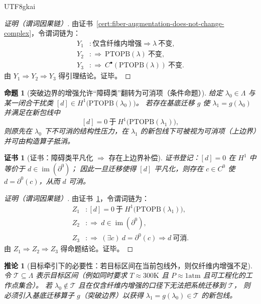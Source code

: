 \documentclass[12pt]{article}
\newtheorem{proposition}{命题}[section]
\newtheorem{corollary}{推论}[section]
\newtheorem{Certificate}{证书}[section]
\newcommand{\PTOPB}{\ensuremath{\mathrm{PTOPB}}}
\begin{document}
\begin{CJK*}{UTF8}{gkai}
\begin{proof}[证明（谓词因果链）]
由证书~\ref{cert:fiber-augmentation-does-not-change-complex}，令谓词链为：
\[
\begin{aligned}
  Y_1 &: \text{仅含纤维内增强}\Rightarrow \lambda\ \text{不变},\\
  Y_2 &: \Rightarrow\ \PTOPB(\lambda)\ \text{不变},\\
  Y_3 &: \Rightarrow\ C^\bullet(\PTOPB(\lambda))\ \text{不变}.
\end{aligned}
\]
由 $Y_1\Rightarrow Y_2\Rightarrow Y_3$ 得引理结论。证毕。
\end{proof}

\begin{proposition}[突破边界的增强允许“障碍类”翻转为可消项（条件命题）]
\label{prop:boundary-shift-can-trivialize-obstruction}
给定 $\lambda_0\in\Lambda$ 与某一闭合干扰类 $[d]\in H^1\bigl(\PTOPB(\lambda_0)\bigr)$。
若存在基底迁移 $g$ 使 $\lambda_1=g(\lambda_0)$ 并满足在新包线中
\[
  [d] = 0\ \text{于}\ H^1\bigl(\PTOPB(\lambda_1)\bigr),
\]
则原先在 $\lambda_0$ 下不可消的结构性压力，在 $\lambda_1$ 的新包线下可被视为可消项（上边界）并可由构造算子抵消。
\end{proposition}

\begin{Certificate}[证书：障碍类平凡化 $\Rightarrow$ 存在上边界补偿]
\label{cert:boundary-shift-can-trivialize-obstruction}
证书登记：$[d]=0$ 在 $H^1$ 中等价于 $d\in\operatorname{im}(\partial^0)$；
因此一旦迁移使得 $[d]$ 平凡化，则存在 $c\in C^0$ 使 $d=\partial^0(c)$，从而 $d$ 可消。
\end{Certificate}

\begin{proof}[证明（谓词因果链）]
由证书~\ref{cert:boundary-shift-can-trivialize-obstruction}，令谓词链为：
\[
\begin{aligned}
  Z_1 &: [d]=0\ \text{于}\ H^1\bigl(\PTOPB(\lambda_1)\bigr),\\
  Z_2 &: \Rightarrow\ d\in\operatorname{im}(\partial^0),\\
  Z_3 &: \Rightarrow\ (\exists c)\ d=\partial^0(c)\Rightarrow d\ \text{可消}.
\end{aligned}
\]
由 $Z_1\Rightarrow Z_2\Rightarrow Z_3$ 得命题结论。证毕。
\end{proof}

\begin{corollary}[目标牵引下的必要性：若目标区间在当前包线外，则仅纤维内增强不足]
\label{cor:need-boundary-shift-for-out-of-envelope-goal}
令 $\mathcal{T}\subseteq\Lambda$ 表示目标区间（例如同时要求 $T\approx 300\text{K}$ 且 $P\approx 1\text{atm}$ 且可工程化的工作点集合）。
若 $\lambda_0\notin\mathcal{T}$ 且在仅含纤维内增强的口径下无法把系统迁移到 $\mathcal{T}$，
则必须引入基底迁移算子 $g$（突破边界）以获得 $\lambda_1=g(\lambda_0)\in\mathcal{T}$ 的新包线。
\end{corollary}


\end{CJK*}
\end{document}
